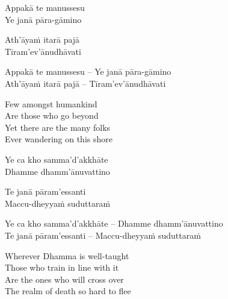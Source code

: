 \begin{pali-hang-verses}
  Appakā te manussesu\\
  Ye janā pāra-gāmino
\end{pali-hang-verses}
\begin{pali-hang-together}
  Ath'āyaṁ itarā pajā\\
  Tīram'ev'ānudhāvati
\end{pali-hang-together}

\else

\begin{verses}
  Appakā te manussesu – Ye janā pāra-gāmino\\
  Ath'āyaṁ itarā pajā – Tīram'ev'ānudhāvati
\end{verses}

\fi

\ifafive\clearpage\fi

\begin{english-verses}
  Few amongst humankind\\
  Are those who go beyond\\
  Yet there are the many folks\\
  Ever wandering on this shore
\end{english-verses}

\ifninebythirteen

\clearpage

\begin{pali-hang-verses}
  Ye ca kho samma'd'akkhāte\\
  Dhamme dhamm'ānuvattino
\end{pali-hang-verses}
\begin{pali-hang-together}
  Te janā pāram'essanti\\
  Maccu-dheyyaṁ suduttaraṁ
\end{pali-hang-together}

\else

\begin{verses}
  Ye ca kho samma'd'akkhāte – Dhamme dhamm'ānuvattino\\
  Te janā pāram'essanti – Maccu-dheyyaṁ suduttaraṁ\\
\end{verses}

\fi

\begin{english-verses}
  Wherever Dhamma is well-taught\\
  Those who train in line with it\\
  Are the ones who will cross over\\
  The realm of death so hard to flee
\end{english-verses}

